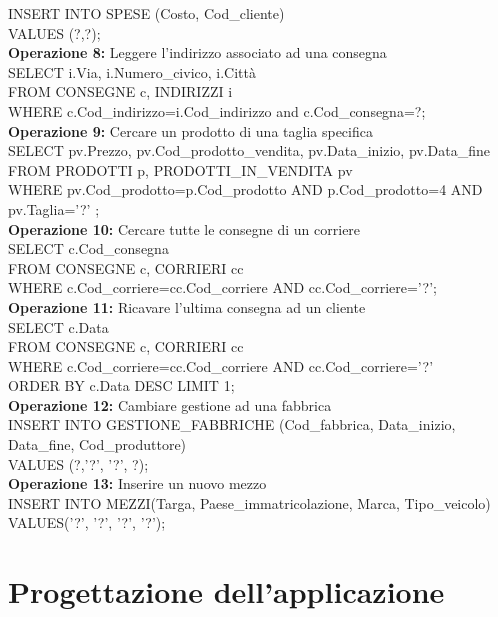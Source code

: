 \documentclass[a4paper,12pt]{report}
\begin{document}
INSERT INTO SPESE (Costo, Cod\_cliente)\\
VALUES (?,?);\\
\textbf{Operazione 8:}
Leggere l'indirizzo associato ad una consegna\\
SELECT i.Via, i.Numero\_civico, i.Città\\
FROM CONSEGNE c, INDIRIZZI i\\
WHERE c.Cod\_indirizzo=i.Cod\_indirizzo and c.Cod\_consegna=?;\\
\textbf{Operazione 9:}
Cercare un prodotto di una taglia specifica\\
SELECT pv.Prezzo, pv.Cod\_prodotto\_vendita, pv.Data\_inizio, pv.Data\_fine\\
FROM PRODOTTI p, PRODOTTI\_IN\_VENDITA pv\\
WHERE pv.Cod\_prodotto=p.Cod\_prodotto AND p.Cod\_prodotto=4 AND pv.Taglia='?' ;\\
\textbf{Operazione 10:}
Cercare tutte le consegne di un corriere\\
SELECT c.Cod\_consegna\\
FROM CONSEGNE c, CORRIERI cc\\
WHERE c.Cod\_corriere=cc.Cod\_corriere AND cc.Cod\_corriere='?';\\
\textbf{Operazione 11:}
Ricavare l'ultima consegna ad un cliente\\
SELECT c.Data\\
FROM CONSEGNE c, CORRIERI cc\\
WHERE c.Cod\_corriere=cc.Cod\_corriere AND cc.Cod\_corriere='?'\\
ORDER BY c.Data DESC LIMIT 1;\\
\textbf{Operazione 12:}
Cambiare gestione ad una fabbrica\\
INSERT INTO GESTIONE\_FABBRICHE (Cod\_fabbrica, Data\_inizio, Data\_fine, Cod\_produttore)\\
VALUES (?,'?', '?', ?);\\
\textbf{Operazione 13:}
Inserire un nuovo mezzo\\
INSERT INTO MEZZI(Targa, Paese\_immatricolazione, Marca, Tipo\_veicolo)\\
VALUES('?', '?', '?', '?');\\
\chapter{Progettazione dell'applicazione}
\end{document}
